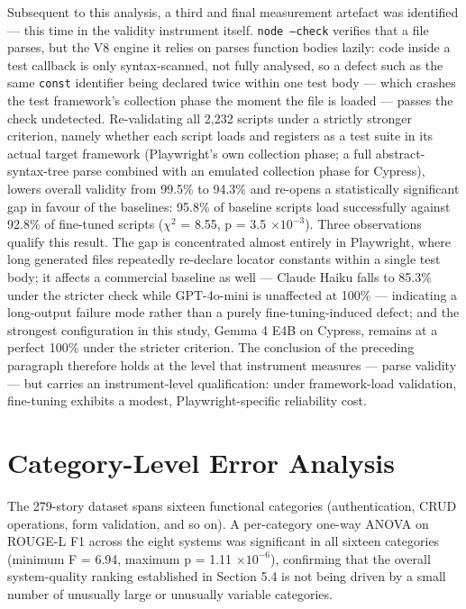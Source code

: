 Subsequent to this analysis, a third and final measurement artefact was
identified --- this time in the validity instrument itself.
\texttt{node --check} verifies that a file parses, but the V8 engine it
relies on parses function bodies lazily: code inside a test callback is
only syntax-scanned, not fully analysed, so a defect such as the same
\texttt{const} identifier being declared twice within one test body ---
which crashes the test framework's collection phase the moment the file
is loaded --- passes the check undetected. Re-validating all 2,232
scripts under a strictly stronger criterion, namely whether each script
loads and registers as a test suite in its actual target framework
(Playwright's own collection phase; a full abstract-syntax-tree parse
combined with an emulated collection phase for Cypress), lowers overall
validity from 99.5\% to 94.3\% and re-opens a statistically significant
gap in favour of the baselines: 95.8\% of baseline scripts load
successfully against 92.8\% of fine-tuned scripts ($\chi^2$ = 8.55, p =
3.5 $\times 10^{-3}$). Three observations qualify this result. The gap
is concentrated almost entirely in Playwright, where long generated
files repeatedly re-declare locator constants within a single test
body; it affects a commercial baseline as well --- Claude Haiku falls
to 85.3\% under the stricter check while GPT-4o-mini is unaffected at
100\% --- indicating a long-output failure mode rather than a purely
fine-tuning-induced defect; and the strongest configuration in this
study, Gemma 4 E4B on Cypress, remains at a perfect 100\% under the
stricter criterion. The conclusion of the preceding paragraph therefore
holds at the level that instrument measures --- parse validity --- but
carries an instrument-level qualification: under framework-load
validation, fine-tuning exhibits a modest, Playwright-specific
reliability cost.

\section{Category-Level Error Analysis}

The 279-story dataset spans sixteen functional categories
(authentication, CRUD operations, form validation, and so on). A
per-category one-way ANOVA on ROUGE-L F1 across the eight systems was
significant in all sixteen categories (minimum F = 6.94, maximum p =
1.11 $\times 10^{-6}$), confirming that the overall system-quality ranking
established in Section 5.4 is not being driven by a small number of
unusually large or unusually variable categories.

